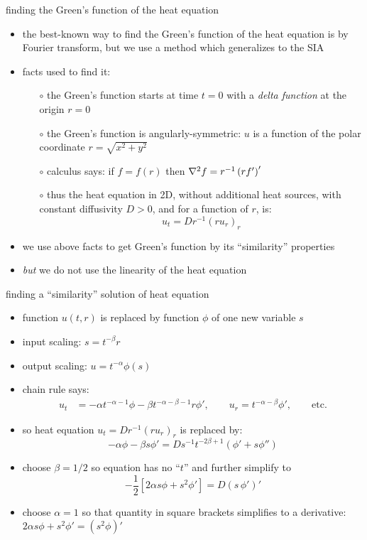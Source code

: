 \begin{frame}{finding the Green's function of the heat equation}

\begin{itemize}
\item the best-known way to find the Green's function of the heat equation is by Fourier transform, but we use a method which generalizes to the SIA
\item facts used to find it:
  \begin{itemize}
    \item[$\circ$] the Green's function starts at time $t=0$ with a \emph{delta function} at the origin $r=0$
    \item[$\circ$] the Green's function is angularly-symmetric:  $u$ is a function of the polar coordinate $r = \sqrt{x^2+y^2}$
    \item[$\circ$] calculus says: if $f=f(r)$ then $\nabla^2 f = r^{-1} \left(r f'\right)'$
    \item[$\circ$] thus the heat equation in 2D, without additional heat sources, with constant diffusivity $D>0$, and for a function of $r$, is:
   $$u_t = D r^{-1} \left(r u_r\right)_r$$
  \end{itemize}
\item we use above facts to get Green's function by its ``similarity'' properties
\item \emph{but} we do not use the linearity of the heat equation
\end{itemize}
\end{frame}


\begin{frame}{finding a ``similarity'' solution of heat equation}
\label{slide:heatsim}

\small
\begin{itemize}
\item function $u(t,r)$ is replaced by function $\phi$ of one new variable $s$
\item input scaling: $s = t^{-\beta} r$
\item output scaling: $u = t^{-\alpha} \phi(s)$
\item chain rule says:
\begin{align*}
  u_t &= -\alpha t^{-\alpha-1} \phi - \beta t^{-\alpha-\beta-1} r \phi', \qquad u_r = t^{-\alpha-\beta} \phi', \qquad \text{etc.}
\end{align*}
\item so heat equation $u_t = D r^{-1} \left(r u_r\right)_r$ is replaced by:
	$$-\alpha \phi - \beta s \phi' = D s^{-1} t^{-2\beta+1} \left(\phi' + s \phi''\right)$$
\item choose $\boxed{\beta=1/2}$ so equation has no ``$t$'' and further simplify to
   $$-\frac{1}{2} \left[2 \alpha s \phi + s^2 \phi'\right] = D \left(s\, \phi'\right)'$$
\item choose $\boxed{\alpha = 1}$ so that quantity in square brackets simplifies to a derivative: $2 \alpha s \phi + s^2 \phi' = \left(s^2 \phi\right)'$
\end{itemize}
\end{frame}


